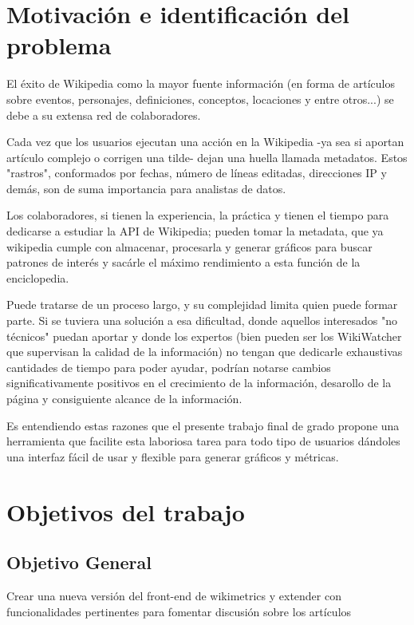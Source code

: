 

\section{Motivación e identificación del problema}

El éxito de Wikipedia como la mayor fuente información (en forma de artículos sobre eventos, personajes, definiciones, conceptos, locaciones y entre otros...) se debe a su extensa red de colaboradores.

Cada vez que los usuarios ejecutan una acción en la Wikipedia -ya sea si aportan artículo complejo o corrigen una tilde- dejan una huella llamada metadatos. Estos "rastros", conformados por fechas, número de líneas editadas, direcciones IP y demás, son de suma importancia para analistas de datos.

Los colaboradores, si tienen la experiencia, la práctica y tienen el tiempo para dedicarse a estudiar la API de Wikipedia; pueden tomar la metadata, que ya wikipedia cumple con almacenar, procesarla y generar gráficos para buscar patrones de interés y sacárle el máximo rendimiento a esta función de la enciclopedia.

Puede tratarse de un proceso largo, y su complejidad limita quien puede formar parte. Si se tuviera una solución a esa dificultad, donde aquellos interesados "no técnicos" puedan aportar y donde los expertos (bien pueden ser los WikiWatcher que supervisan la calidad de la información) no tengan que dedicarle exhaustivas cantidades de tiempo para poder ayudar, podrían notarse cambios significativamente positivos en el crecimiento de la información, desarollo de la página y consiguiente alcance de la información.

Es entendiendo estas razones que el presente trabajo final de grado propone una herramienta que facilite esta laboriosa tarea para todo tipo de usuarios dándoles una interfaz fácil de usar y flexible para generar gráficos y métricas.


\section{Objetivos del trabajo}




\subsection{Objetivo General}
Crear una nueva versión del front-end de wikimetrics y extender con funcionalidades pertinentes para fomentar discusión sobre los artículos

